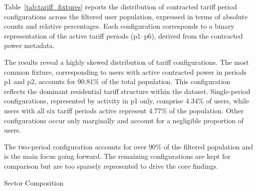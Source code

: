 ﻿\documentclass[12pt,reqno, twoside]{amsbook}
\makeatletter
\numberwithin{figure}{chapter}
\numberwithin{table}{chapter}
\numberwithin{equation}{chapter}
\def\subsection{\@startsection{subsection}{2}%
      \z@{.5\linespacing\@plus.7\linespacing}{.25\linespacing}%
      {\normalfont\bfseries\flushleft}}
\theoremstyle{plain}
\numberwithin{equation}{chapter}
\numberwithin{section}{chapter}
\makeatother
\begin{document}
Table~\ref{tab:tariff_fixtures} reports the distribution of contracted tariff period configurations across the filtered user population, expressed in terms of absolute counts and relative percentages. Each configuration corresponds to a binary representation of the active tariff periods (p1–p6), derived from the contracted power metadata.
\par
The results reveal a highly skewed distribution of tariff configurations. The most common fixture, corresponding to users with active contracted power in periods p1 and p2, accounts for 90.81\% of the total population. This configuration reflects the dominant residential tariff structure within the dataset. Single-period configurations, represented by activity in p1 only, comprise 4.34\% of users, while users with all six tariff periods active represent 4.77\% of the population. Other configurations occur only marginally and account for a negligible proportion of users.
\par
The two-period configuration accounts for over 90\% of the filtered population and is the main focus going forward. The remaining configurations are kept for comparison but are too sparsely represented to drive the core findings.

\subsection{Sector Composition}
\end{document}
